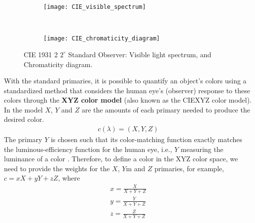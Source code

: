 \begin{figure}[!ht]
    \centering
    \begin{subfigure}[c]{0.65\textwidth}
        \texttt{[image: CIE\_visible\_spectrum]}
        \caption{}
        \label{fig:visual_spectrum}
    \end{subfigure}\\
    \begin{subfigure}[c]{0.65\textwidth}
        \texttt{[image: CIE\_chromaticity\_diagram]}
        \caption{}
        \label{fig:chrom_diagram}
    \end{subfigure} 
                      
    \caption{CIE 1931 2 $2^\circ$ Standard Observer:  Visible light spectrum, and  Chromaticity diagram.}\label{fig:cie_standard_observer}    
\end{figure}

With the standard primaries, it is possible to quantify an object's colors using a standardized method that considers the human eye's (observer) response to these colors through the \textbf{XYZ color model} (also known as the CIEXYZ color model). In the model $X$, $Y$ and $Z$ are the amounts of each primary needed to produce the desired color.
\begin{eqnarray} 
 c(\lambda) = (X,Y,Z) \label{eq:XYZ_color}
\end{eqnarray}
The primary $Y$ is chosen such that its color-matching function exactly matches the luminous-efficiency function for the human eye, i.e., $Y$ measuring the luminance of a color \citep{Wright:BookCh2:2007}. Therefore, to define a color in the  XYZ color space, we need to provide the weights for the $X$, $Y$m and $Z$ primaries, for example, $c =xX + yY + zZ$, where 
\begin{gather} 
	x = \frac{X}{X+Y+Z} \nonumber \\ 
	y = \frac{Y}{X+Y+Z} \label{eq:xyz_color_coords} \\ 
	z = \frac{Z}{X+Y+Z} \nonumber 
\end{gather}

